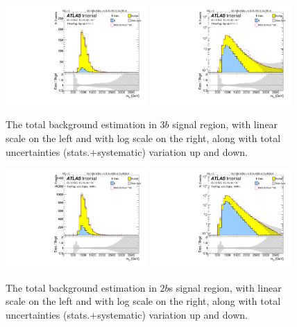 \begin{figure}
\begin{center}
\includegraphics[angle=270, width=0.48\textwidth]{./figures/boosted/Signal_Syst/Moriond_bkg_9_ThreeTag_Signal_mHH_l_blind.pdf}
\includegraphics[angle=270, width=0.48\textwidth]{./figures/boosted/Signal_Syst/Moriond_bkg_9_ThreeTag_Signal_mHH_l_1_blind.pdf}
\caption{The total background estimation in $3b$ signal region, with linear scale on the left and with log scale on the right, along with total uncertainties (stats.$+$systematic) variation up and down.}
\label{fig:FinalBkg_sys-3b}
\end{center}
\end{figure}


\begin{figure}
\begin{center}
\includegraphics[angle=270, width=0.48\textwidth]{./figures/boosted/Signal_Syst/Moriond_bkg_9_TwoTag_split_Signal_mHH_l_blind.pdf}
\includegraphics[angle=270, width=0.48\textwidth]{./figures/boosted/Signal_Syst/Moriond_bkg_9_TwoTag_split_Signal_mHH_l_1_blind.pdf}
\caption{The total background estimation in $2b$s signal region, with linear scale on the left and with log scale on the right, along with total uncertainties (stats.$+$systematic) variation up and down.}
\label{fig:FinalBkg_sys-2b}
\end{center}
\end{figure}

